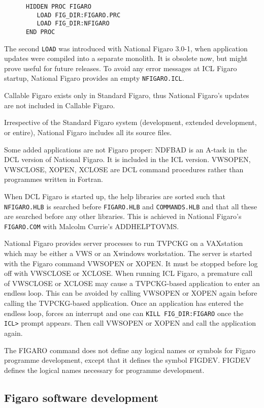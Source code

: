 \begin{verbatim}
      HIDDEN PROC FIGARO
         LOAD FIG_DIR:FIGARO.PRC
         LOAD FIG_DIR:NFIGARO
      END PROC
\end{verbatim}

The second {\tt LOAD} was introduced with National Figaro 3.0-1, when
application updates were compiled into a separate monolith. It is obsolete now,
but might prove useful for future releases. To avoid any error messages at ICL
Figaro startup, National Figaro provides an empty {\tt NFIGARO.ICL}.

Callable Figaro exists only in Standard Figaro, thus National Figaro's updates
are not included in Callable Figaro.

Irrespective of the Standard Figaro system (development, extended development,
or entire), National Figaro includes all its source files.

Some added applications are not Figaro proper: NDFBAD is an A-task in the DCL
version of National Figaro. It is included in the ICL version. VWSOPEN,
VWSCLOSE, XOPEN, XCLOSE are DCL command procedures rather than programmes
written in Fortran.

When DCL Figaro is started up, the help libraries are sorted such that {\tt
NFIGARO.HLB} is searched before {\tt FIGARO.HLB} and {\tt COMMANDS.HLB} and
that all these are searched before any other libraries. This is achieved in
National Figaro's {\tt FIGARO.COM} with Malcolm Currie's ADD\-HELP\-TO\-VMS.

National Figaro provides server processes to run TVPCKG on a VAXstation which
may be either a VWS or an Xwindows workstation. The server is started with the
Figaro command VWSOPEN or XOPEN. It must be stopped before log off with
VWSCLOSE or XCLOSE. When running ICL Figaro, a premature call of VWSCLOSE or
XCLOSE may cause a TVPCKG-based application to enter an endless loop. This can
be avoided by calling VWSOPEN or XOPEN again before calling the TVPCKG-based
application. Once an application has entered the endless loop, {\tt <CTRL-C>}
forces an interrupt and one can {\tt KILL FIG\_DIR:FIGARO} once the {\tt ICL>}
prompt appears. Then call VWSOPEN or XOPEN and call the application again.

The FIGARO command does not define any logical names or symbols for Figaro
programme development, except that it defines the symbol FIGDEV. FIGDEV defines
the logical names necessary for programme development.


\subsection{Figaro software development}
\label{develop}

